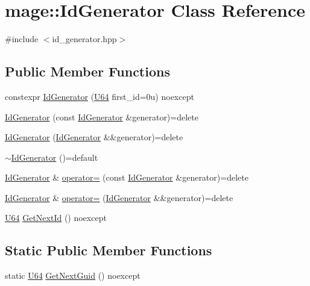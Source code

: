 \hypertarget{classmage_1_1_id_generator}{}\section{mage\+:\+:Id\+Generator Class Reference}
\label{classmage_1_1_id_generator}


{\ttfamily \#include $<$id\+\_\+generator.\+hpp$>$}

\subsection*{Public Member Functions}
\begin{DoxyCompactItemize}
\item 
constexpr \mbox{\hyperlink{classmage_1_1_id_generator_a3a9dc810d9ce4fcdf9bea206723c78d0}{Id\+Generator}} (\mbox{\hyperlink{namespacemage_ae0ad2dd0035dba92ed0f2e84c182b03b}{U64}} first\+\_\+id=0u) noexcept
\item 
\mbox{\hyperlink{classmage_1_1_id_generator_a1abb8c44b89ac1344ad8016f54e076de}{Id\+Generator}} (const \mbox{\hyperlink{classmage_1_1_id_generator}{Id\+Generator}} \&generator)=delete
\item 
\mbox{\hyperlink{classmage_1_1_id_generator_a0f678af51553c455655589ecfe7f1c8f}{Id\+Generator}} (\mbox{\hyperlink{classmage_1_1_id_generator}{Id\+Generator}} \&\&generator)=delete
\item 
\mbox{\hyperlink{classmage_1_1_id_generator_a70161ab5b10294ebba1ace7a3b0f8d31}{$\sim$\+Id\+Generator}} ()=default
\item 
\mbox{\hyperlink{classmage_1_1_id_generator}{Id\+Generator}} \& \mbox{\hyperlink{classmage_1_1_id_generator_adf4539050d910996e914df51f22236c6}{operator=}} (const \mbox{\hyperlink{classmage_1_1_id_generator}{Id\+Generator}} \&generator)=delete
\item 
\mbox{\hyperlink{classmage_1_1_id_generator}{Id\+Generator}} \& \mbox{\hyperlink{classmage_1_1_id_generator_aeb8bfd849689d74eb450b0c1c2044086}{operator=}} (\mbox{\hyperlink{classmage_1_1_id_generator}{Id\+Generator}} \&\&generator)=delete
\item 
\mbox{\hyperlink{namespacemage_ae0ad2dd0035dba92ed0f2e84c182b03b}{U64}} \mbox{\hyperlink{classmage_1_1_id_generator_ae51ebc69faac9974553b7c647981dc57}{Get\+Next\+Id}} () noexcept
\end{DoxyCompactItemize}
\subsection*{Static Public Member Functions}
\begin{DoxyCompactItemize}
\item 
static \mbox{\hyperlink{namespacemage_ae0ad2dd0035dba92ed0f2e84c182b03b}{U64}} \mbox{\hyperlink{classmage_1_1_id_generator_af6df2ba2fb7172e7753c69a4aec1e6bf}{Get\+Next\+Guid}} () noexcept
\end{DoxyCompactItemize}
